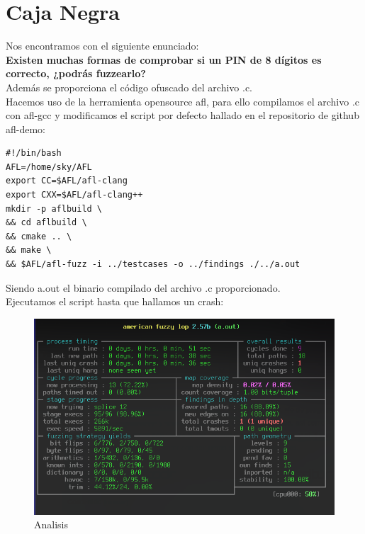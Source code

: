 \documentclass[12pt, a4paper,twoside,titlepage]{article}
\begin{document}
\newpage

\section{Caja Negra}

Nos encontramos con el siguiente enunciado:\\


\textbf{Existen muchas formas de comprobar si un PIN de 8 dígitos es correcto, ¿podrás fuzzearlo?}\\

Además se proporciona el código ofuscado del archivo .c.\\

Hacemos uso de la herramienta opensource afl, para ello compilamos el archivo .c con afl-gcc y modificamos el script por defecto hallado en el repositorio de github afl-demo:


\begin{verbatim}
#!/bin/bash
AFL=/home/sky/AFL
export CC=$AFL/afl-clang
export CXX=$AFL/afl-clang++
mkdir -p aflbuild \
&& cd aflbuild \
&& cmake .. \
&& make \
&& $AFL/afl-fuzz -i ../testcases -o ../findings ./../a.out
\end{verbatim}

Siendo a.out el binario compilado del archivo .c proporcionado.\\

Ejecutamos el script hasta que hallamos un crash:

\begin{figure}[H]
    \centering
    \includegraphics[width=140mm]{Figuras/Caja Negra/Analisis.png}
    \caption{Analisis}
    \label{fig:my_label}
\end{figure}
\end{document}
